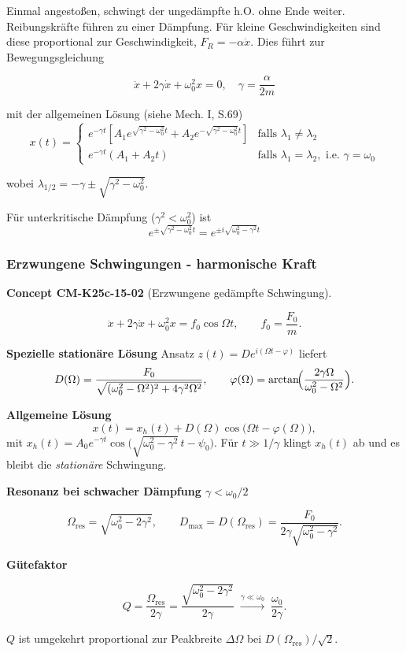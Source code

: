\documentclass[10pt, letterpaper]{article}
\newcommand{\CustomHeading}[3]{%
  \par\medskip\noindent%
  \textbf{#1 #2} \textnormal{(#3)}.\enskip%
}
\newenvironment{CONC}[2]{\begin{unitbox}\CustomHeading{Concept}{#1}{#2}}{\end{unitbox}}
\begin{document}
Einmal angestoßen, schwingt der ungedämpfte h.O. ohne Ende weiter. Reibungskräfte führen zu einer Dämpfung. Für kleine Geschwindigkeiten sind diese proportional zur Geschwindigkeit, $F_R = -\alpha \dot{x}$. Dies führt zur Bewegungsgleichung

\[\ddot{x} + 2\gamma \dot{x} + \omega_0^2 x = 0, \quad \gamma = \frac{\alpha}{2m}\]

mit der allgemeinen Lösung (siehe Mech. I, S.69)
\[x(t) = \begin{cases}
e^{-\gamma t}\left[A_1 e^{\sqrt{\gamma^2-\omega_0^2}t} + A_2 e^{-\sqrt{\gamma^2-\omega_0^2}t}\right] & \text{falls }\lambda_1\neq\lambda_2\\
e^{-\gamma t}(A_1 + A_2 t) & \text{falls }\lambda_1=\lambda_2, \text{ i.e. }\gamma=\omega_0
\end{cases}\]

wobei $\lambda_{1/2} = -\gamma \pm \sqrt{\gamma^2-\omega_0^2}$.

Für unterkritische Dämpfung ($\gamma^2 < \omega_0^2$) ist
\[e^{\pm\sqrt{\gamma^2-\omega_0^2}t} = e^{\pm i\sqrt{\omega_0^2-\gamma^2}t}\]




\subsubsection*{Erzwungene Schwingungen - harmonische Kraft}



\begin{CONC}{CM-K25c-15-02}{Erzwungene gedämpfte Schwingung}
\[
\ddot x + 2\gamma\dot x + \omega_{0}^{2}x
  = f_{0}\cos\Omega t,
  \qquad
  f_{0}=\frac{F_{0}}{m}.
\]

\textbf{Spezielle stationäre Lösung}  
Ansatz $z(t)=D e^{i(\Omega t-\varphi)}$ liefert  
\[
D(\Omega)=\frac{F_{0}}
               {\sqrt{(\omega_{0}^{2}-\Omega^{2})^{2}+4\gamma^{2}\Omega^{2}}},
\qquad
\varphi(\Omega)=\arctan\!\Bigl(\frac{2\gamma\Omega}
                                      {\omega_{0}^{2}-\Omega^{2}}\Bigr).
\]

\textbf{Allgemeine Lösung}  
\[
x(t)=x_{h}(t)+D(\Omega)\cos\bigl(\Omega t-\varphi(\Omega)\bigr),
\]
mit
\(x_{h}(t)=A_{0}e^{-\gamma t}\cos\bigl(\sqrt{\omega_{0}^{2}-\gamma^{2}}\,t-\psi_{0}\bigr)\).
Für \(t\gg 1/\gamma\) klingt $x_{h}(t)$ ab und es bleibt die \emph{stationäre} Schwingung.

\textbf{Resonanz bei schwacher Dämpfung \(\gamma<\omega_{0}/2\)}

\[
\Omega_{\text{res}}=\sqrt{\omega_{0}^{2}-2\gamma^{2}},
\qquad
D_{\max}=D(\Omega_{\text{res}})
         =\frac{F_{0}}{2\gamma\sqrt{\omega_{0}^{2}-\gamma^{2}}}.
\]

\textbf{Gütefaktor}

\[
Q=\frac{\Omega_{\text{res}}}{2\gamma}
  =\frac{\sqrt{\omega_{0}^{2}-2\gamma^{2}}}{2\gamma}
  \;\stackrel{\gamma\ll\omega_{0}}{\longrightarrow}\;
  \frac{\omega_{0}}{2\gamma}.
\]

$Q$ ist umgekehrt proportional zur Peakbreite
\(\Delta\Omega\) bei $D(\Omega_{\text{res}})/\sqrt{2}$.
\end{CONC}
\end{document}
